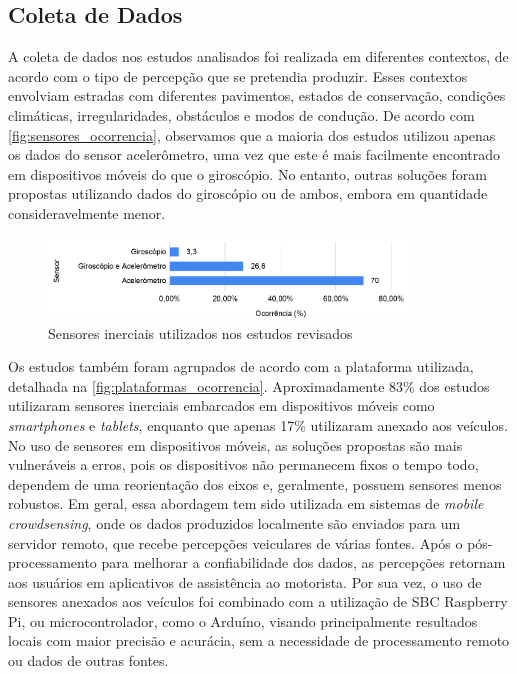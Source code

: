 \subsection{Coleta de Dados}

A coleta de dados nos estudos analisados foi realizada em diferentes contextos, de acordo com o tipo de percepção que se pretendia produzir. Esses contextos envolviam estradas com diferentes pavimentos, estados de conservação, condições climáticas, irregularidades, obstáculos e modos de condução. De acordo com \autoref{fig:sensores_ocorrencia}, observamos que a maioria dos estudos utilizou apenas os dados do sensor acelerômetro, uma vez que este é mais facilmente encontrado em dispositivos móveis do que o giroscópio. No entanto, outras soluções foram propostas utilizando dados do giroscópio ou de ambos, embora em quantidade consideravelmente menor.

\begin{figure}[h!]
  \centering
  \caption{Sensores inerciais utilizados nos estudos revisados}
   \label{fig:sensores_ocorrencia}
   \includegraphics[width=0.85\textwidth]{figuras/fig_14.png}
\end{figure}

Os estudos também foram agrupados de acordo com a plataforma utilizada, detalhada na \autoref{fig:plataformas_ocorrencia}. Aproximadamente 83\% dos estudos utilizaram sensores inerciais embarcados em dispositivos móveis como \textit{smartphones} e \textit{tablets}, enquanto que apenas 17\% utilizaram anexado aos veículos. No uso de sensores em dispositivos móveis, as soluções propostas são mais vulneráveis a erros, pois os dispositivos não permanecem fixos o tempo todo, dependem de uma reorientação dos eixos e, geralmente, possuem sensores menos robustos. Em geral, essa abordagem tem sido utilizada em sistemas de \textit{mobile crowdsensing}, onde os dados produzidos localmente são enviados para um servidor remoto, que recebe percepções veiculares de várias fontes. Após o pós-processamento para melhorar a confiabilidade dos dados, as percepções retornam aos usuários em aplicativos de assistência ao motorista. Por sua vez, o uso de sensores anexados aos veículos foi combinado com a utilização de SBC Raspberry Pi, ou microcontrolador, como o Arduíno, visando principalmente resultados locais com maior precisão e acurácia, sem a necessidade de processamento remoto ou dados de outras fontes.

